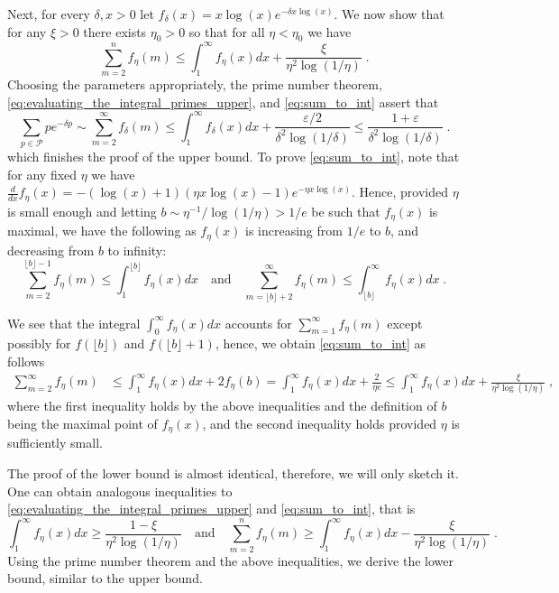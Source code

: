 \documentclass[11pt]{article}
\makeatletter
\theoremstyle{plain}
\renewenvironment{proof}[1][\proofname]
{\par\pushQED{\qed}
	\normalfont\topsep6\p@\@plus6\p@\relax\trivlist
	\item[\hskip\labelsep\bfseries#1\@addpunct{.}]
	\ignorespaces}
{\popQED\endtrivlist\@endpefalse}
\makeatother
\begin{document}
\begin{proof}[Proof of Lemma \ref{lem:prime_sum}]
Next, for every $\delta,x>0$ let $f_\delta(x)=x\log(x)e^{-\delta x\log(x)}$. We now show that for any $\xi>0$ there exists $\eta_0>0$ so that for all $\eta<\eta_0$ we have
\begin{equation}\label{eq:sum_to_int}
    \sum_{m=2}^{n} f_\eta(m)\leq \int_{1}^{\infty}f_\eta(x) dx+\frac{\xi}{\eta^2\log(1/\eta)}\;.
\end{equation}
Choosing the parameters appropriately, the prime number theorem, \eqref{eq:evaluating_the_integral_primes_upper}, and \eqref{eq:sum_to_int} assert that
\[
    \sum_{p\in \mathcal{P}}pe^{-\delta p}\sim \sum_{m=2}^{\infty}f_\delta(m)\leq \int_{1}^{\infty}f_{\delta}(x)dx+\frac{\varepsilon/2}{\delta^2\log(1/\delta)}\leq \frac{1+\varepsilon}{\delta^2\log(1/\delta)} \;.
\]
which finishes the proof of the upper bound. To prove \eqref{eq:sum_to_int}, note that for any fixed $\eta$ we have
$\frac{d}{dx}f_\eta(x)=-(\log(x)+1)(\eta x\log(x)-1)e^{-\eta x\log(x)}$.
Hence, provided $\eta$ is small enough and letting $b\sim \eta^{-1}/\log(1/\eta)>1/e$ be such that $f_\eta(x)$ is maximal, we have the following as $f_\eta(x)$ is increasing from $1/e$ to $b$, and decreasing from $b$ to infinity:
\[
    \sum_{m=2}^{\lfloor b \rfloor -1}f_\eta(m)\leq \int_{1}^{\lfloor b\rfloor}f_\eta(x)dx\quad \text{and}\quad \sum_{m=\lfloor b \rfloor+2}^{\infty} f_\eta(m)\leq \int_{\lfloor b\rfloor}^{\infty}f_\eta(x) dx\;.
\]

We see that the integral $\int_{0}^{\infty}f_\eta(x)dx$ accounts for $\sum_{m=1}^{\infty}f_\eta(m)$ except possibly for $f(\lfloor b\rfloor)$ and $f(\lfloor b\rfloor +1)$, hence, we obtain \eqref{eq:sum_to_int} as follows
\begin{align*}
    \sum_{m=2}^{\infty}f_\eta(m)&\leq \int_{1}^{\infty}f_\eta(x)dx+2f_\eta(b)=\int_{1}^{\infty}f_\eta(x)dx+\frac{2}{\eta e}\leq \int_{1}^{\infty}f_\eta(x)dx+\frac{\xi}{\eta^2\log(1/\eta)}\;,
\end{align*}
where the first inequality holds by the above inequalities and the definition of $b$ being the maximal point of $f_\eta(x)$, and the second inequality holds provided $\eta$ is sufficiently small.

The proof of the lower bound is almost identical, therefore, we will only sketch it. One can obtain analogous inequalities to \eqref{eq:evaluating_the_integral_primes_upper} and \eqref{eq:sum_to_int}, that is
\[
    \int_1^{\infty}f_\eta(x)dx\geq \frac{1-\xi}{\eta^2\log(1/\eta)}\quad \text{and}\quad
    \sum_{m=2}^{n} f_\eta(m)\geq \int_{1}^{\infty}f_\eta(x)dx-\frac{\xi}{\eta^2\log(1/\eta)}\;.
\]
Using the prime number theorem and the above inequalities, we derive the lower bound, similar to the upper bound.
\end{proof}
\end{document}
